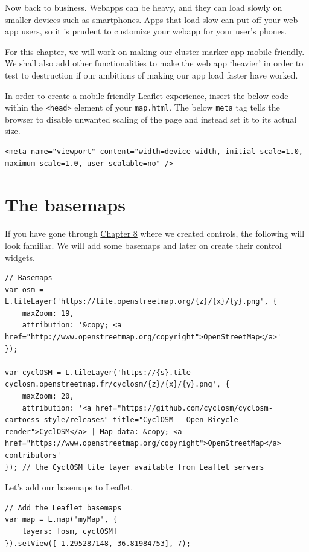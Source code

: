 \documentclass[
]{book}
\begin{document}
Now back to business. Webapps can be heavy, and they can load slowly on smaller devices such as smartphones. Apps that load slow can put off your web app users, so it is prudent to customize your webapp for your user's phones.

For this chapter, we will work on making our cluster marker app mobile friendly. We shall also add other functionalities to make the web app `heavier' in order to test to destruction if our ambitions of making our app load faster have worked.

In order to create a mobile friendly Leaflet experience, insert the below code within the \texttt{\textless{}head\textgreater{}} element of your \texttt{map.html}. The below \texttt{meta} tag tells the browser to disable unwanted scaling of the page and instead set it to its actual size.

\begin{verbatim}
<meta name="viewport" content="width=device-width, initial-scale=1.0, maximum-scale=1.0, user-scalable=no" />
\end{verbatim}

\hypertarget{the-basemaps}{%
\section{The basemaps}\label{the-basemaps}}

If you have gone through \protect\hyperlink{layer-groups-and-controls}{Chapter 8} where we created controls, the following will look familiar. We will add some basemaps and later on create their control widgets.

\begin{verbatim}
// Basemaps
var osm = L.tileLayer('https://tile.openstreetmap.org/{z}/{x}/{y}.png', {
    maxZoom: 19,
    attribution: '&copy; <a href="http://www.openstreetmap.org/copyright">OpenStreetMap</a>'
});

var cyclOSM = L.tileLayer('https://{s}.tile-cyclosm.openstreetmap.fr/cyclosm/{z}/{x}/{y}.png', {
    maxZoom: 20,
    attribution: '<a href="https://github.com/cyclosm/cyclosm-cartocss-style/releases" title="CyclOSM - Open Bicycle render">CyclOSM</a> | Map data: &copy; <a href="https://www.openstreetmap.org/copyright">OpenStreetMap</a> contributors'
}); // the CyclOSM tile layer available from Leaflet servers
\end{verbatim}

Let's add our basemaps to Leaflet.

\begin{verbatim}
// Add the Leaflet basemaps
var map = L.map('myMap', {
    layers: [osm, cyclOSM]
}).setView([-1.295287148, 36.81984753], 7);
\end{verbatim}
\end{document}
